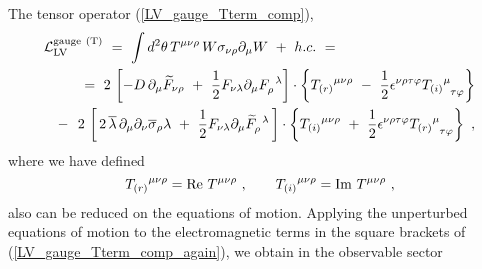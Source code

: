 \documentclass[paper,12pt]{revtex4}
\begin{document}
	The tensor operator (\ref{LV_gauge_Tterm_comp}),
\begin{eqnarray}
\nonumber
\lefteqn{
	\mathcal{L}_{\mathrm{LV}}^{\mathrm{gauge\ (T)}}  ~=~ 
	\int d^2\theta \, T^{\mu\nu\rho} \,
	        W \sigma_{\nu\rho} \partial_\mu W  ~+~ h.c. ~=~ } \\
\label{LV_gauge_Tterm_comp_again}
        &&
        =~
	2\,
	\left[
	   - D\, \partial_\mu \widetilde{F}_{\nu\rho} 
	   ~+~
	   \frac{1}{2}
	   F_{\nu\lambda}\partial_\mu F_\rho^{\phantom{\rho}\lambda}
	\right] 
	\cdot
	\left\{
	{T_{(r)}}^{\mu\nu\rho} 
	~-~
	\frac{1}{2} \epsilon^{\nu\rho\tau\varphi}
	{T_{(i)}}^\mu_{\phantom{\mu}\tau\varphi}
	\right\}
	\\
\nonumber
        &&
        -~~
	2\,
	\left[\,
	    2\, \overline{\lambda}\, \partial_\mu \partial_\nu
	    \overline{\sigma}_\rho \lambda
	    ~+~
	    \frac{1}{2} F_{\nu\lambda} \partial_\mu
	    \widetilde{F}_\rho^{\phantom{\rho}\lambda}
	    \,
	\right]
	\cdot
	\left\{
	   {T_{(i)}}^{\mu\nu\rho} 
	   ~+~
	   \frac{1}{2} \epsilon^{\nu\rho\tau\varphi}
	   {T_{(r)}}^\mu_{\phantom{\mu}\tau\varphi}
	\right\}~,
\end{eqnarray}
        where we have defined
\begin{equation}
\nonumber
 	{T_{(r)}}^{\mu\nu\rho}  =  {\rm Re}~ T^{\mu\nu\rho}~, 
	\qquad
 	{T_{(i)}}^{\mu\nu\rho}  =  {\rm Im}~ T^{\mu\nu\rho}~, 
\end{equation}
        also can be reduced on the equations of motion.
	Applying the unperturbed equations of motion to the 
	electromagnetic terms in the square brackets of 
	(\ref{LV_gauge_Tterm_comp_again}), we obtain in the
	observable sector
\end{document}
